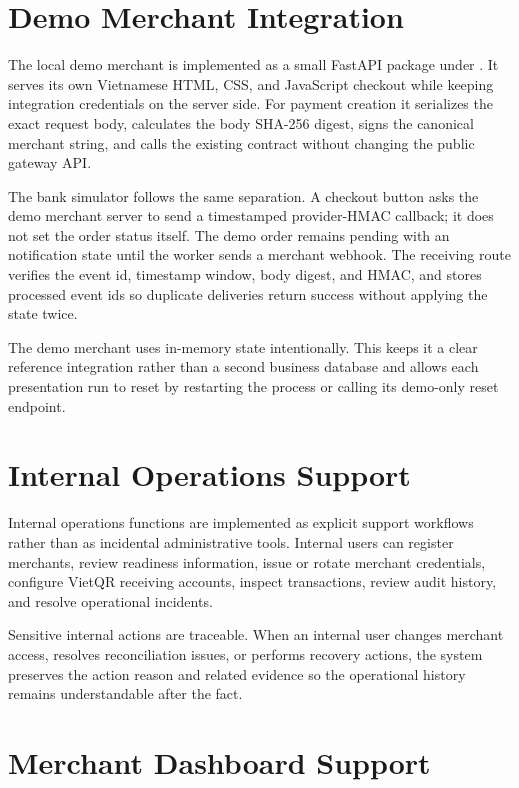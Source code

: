 \section{Demo Merchant Integration}

The local demo merchant is implemented as a small FastAPI package under
. It serves its own Vietnamese HTML, CSS, and
JavaScript checkout while keeping integration credentials on the server side.
For payment creation it serializes the exact request body, calculates the body
SHA-256 digest, signs the canonical merchant string, and calls the existing
 contract without changing the public gateway API.

The bank simulator follows the same separation. A checkout button asks the demo
merchant server to send a timestamped provider-HMAC callback; it does not set
the order status itself. The demo order remains pending with an
 notification state until the worker sends a merchant
webhook. The receiving route verifies the event id, timestamp window, body
digest, and HMAC, and stores processed event ids so duplicate deliveries return
success without applying the state twice.

The demo merchant uses in-memory state intentionally. This keeps it a clear
reference integration rather than a second business database and allows each
presentation run to reset by restarting the process or calling its demo-only
reset endpoint.

\section{Internal Operations Support}

Internal operations functions are implemented as explicit support workflows
rather than as incidental administrative tools. Internal users can register
merchants, review readiness information, issue or rotate merchant credentials,
configure VietQR receiving accounts, inspect transactions, review audit
history, and resolve operational incidents.

Sensitive internal actions are traceable. When an internal user changes
merchant access, resolves reconciliation issues, or performs recovery actions,
the system preserves the action reason and related evidence so the operational
history remains understandable after the fact.

\section{Merchant Dashboard Support}


